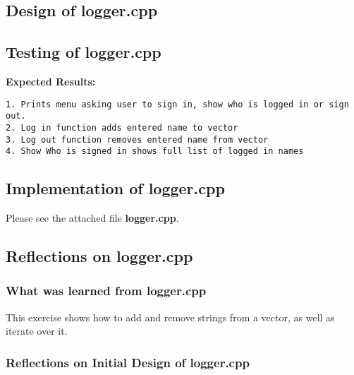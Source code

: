 \documentclass[11pt, oneside]{memoir}
\begin{document}
\subsection{Design of logger.cpp}

\subsection{Testing of logger.cpp}

\textbf{Expected Results:}
\begin{verbatim}
1. Prints menu asking user to sign in, show who is logged in or sign
out.
2. Log in function adds entered name to vector
3. Log out function removes entered name from vector
4. Show Who is signed in shows full list of logged in names
\end{verbatim}

\subsection{Implementation of logger.cpp}
% 

Please see the attached file \textbf{logger.cpp}.

\subsection{Reflections on logger.cpp}

\subsubsection{What was learned from logger.cpp}

This exercise shows how to add and remove strings from a vector, as
well as iterate over it.  

\subsubsection{Reflections on Initial Design of logger.cpp}
\end{document}
